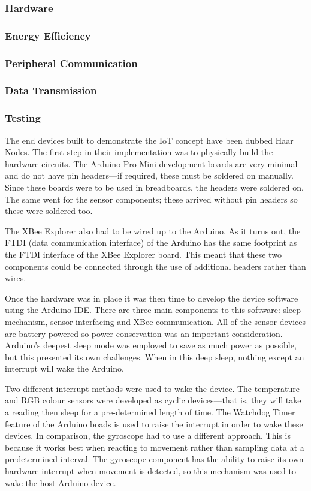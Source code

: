      \subsubsection{Hardware}
      \subsubsection{Energy Efficiency}
      \subsubsection{Peripheral Communication}
      \subsubsection{Data Transmission}
      \subsubsection{Testing}
      The end devices built to demonstrate the IoT concept have been dubbed Haar Nodes. The first step in their implementation was to physically build the hardware circuits. The Arduino Pro Mini development boards are very minimal and do not have pin headers---if required, these must be soldered on manually. Since these boards were to be used in breadboards, the headers were soldered on. The same went for the sensor components; these arrived without pin headers so these were soldered too.

      The XBee Explorer also had to be wired up to the Arduino. As it turns out, the FTDI (data communication interface) of the Arduino has the same footprint as the FTDI interface of the XBee Explorer board. This meant that these two components could be connected through the use of additional headers rather than wires. 

      Once the hardware was in place it was then time to develop the device software using the Arduino IDE. There are three main components to this software: sleep mechanism, sensor interfacing and XBee communication. All of the sensor devices are battery powered so power conservation was an important consideration. Arduino's deepest sleep mode was employed to save as much power as possible, but this presented its own challenges. When in this deep sleep, nothing except an interrupt will wake the Arduino.

      Two different interrupt methods were used to wake the device. The temperature and RGB colour sensors were developed as cyclic devices---that is, they will take a reading then sleep for a pre-determined length of time. The Watchdog Timer feature of the Arduino boads is used to raise the interrupt in order to wake these devices. In comparison, the gyroscope had to use a different approach. This is because it works best when reacting to movement rather than sampling data at a predetermined interval. The gyroscope component has the ability to raise its own hardware interrupt when movement is detected, so this mechanism was used to wake the host Arduino device.

